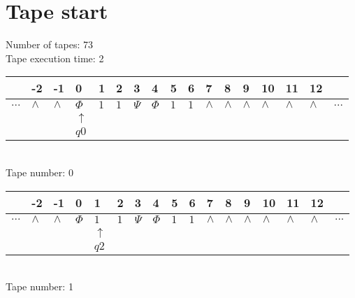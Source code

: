 \documentclass{article}
\begin{document}
\section{Tape start}
Number of tapes: 73\\
Tape execution time: 2\\

\begin{table}[H]
\centering
\begin{tabular}{lllllllllllllllll}
 & -2 & -1 & 0 & 1 & 2 & 3 & 4 & 5 & 6 & 7 & 8 & 9 & 10 & 11 & 12 & \\
\hline
$...$ & \multicolumn{1}{|l|}{$\wedge$} & \multicolumn{1}{|l|}{$\wedge$} & \multicolumn{1}{|l|}{$\Phi$} & \multicolumn{1}{|l|}{$1$} & \multicolumn{1}{|l|}{$1$} & \multicolumn{1}{|l|}{$\Psi$} & \multicolumn{1}{|l|}{$\Phi$} & \multicolumn{1}{|l|}{$1$} & \multicolumn{1}{|l|}{$1$} & \multicolumn{1}{|l|}{$\wedge$} & \multicolumn{1}{|l|}{$\wedge$} & \multicolumn{1}{|l|}{$\wedge$} & \multicolumn{1}{|l|}{$\wedge$} & \multicolumn{1}{|l|}{$\wedge$} & \multicolumn{1}{|l|}{$\wedge$} & $...$\\
\hline
&  &  & $\uparrow$ &  &  &  &  &  &  &  &  &  &  &  &  &  \\
&  &  & $ q0 $ &  &  &  &  &  &  &  &  &  &  &  &  &  \\
\end{tabular}
\\
Tape number: 0
\noindent\makebox[\linewidth]{\hdashrule{\textwidth}{1pt}{1pt}}\end{table}

\begin{table}[H]
\centering
\begin{tabular}{lllllllllllllllll}
 & -2 & -1 & 0 & 1 & 2 & 3 & 4 & 5 & 6 & 7 & 8 & 9 & 10 & 11 & 12 & \\
\hline
$...$ & \multicolumn{1}{|l|}{$\wedge$} & \multicolumn{1}{|l|}{$\wedge$} & \multicolumn{1}{|l|}{$\Phi$} & \multicolumn{1}{|l|}{$1$} & \multicolumn{1}{|l|}{$1$} & \multicolumn{1}{|l|}{$\Psi$} & \multicolumn{1}{|l|}{$\Phi$} & \multicolumn{1}{|l|}{$1$} & \multicolumn{1}{|l|}{$1$} & \multicolumn{1}{|l|}{$\wedge$} & \multicolumn{1}{|l|}{$\wedge$} & \multicolumn{1}{|l|}{$\wedge$} & \multicolumn{1}{|l|}{$\wedge$} & \multicolumn{1}{|l|}{$\wedge$} & \multicolumn{1}{|l|}{$\wedge$} & $...$\\
\hline
&  &  &  & $\uparrow$ &  &  &  &  &  &  &  &  &  &  &  &  \\
&  &  &  & $ q2 $ &  &  &  &  &  &  &  &  &  &  &  &  \\
\end{tabular}
\\
Tape number: 1
\noindent\makebox[\linewidth]{\hdashrule{\textwidth}{1pt}{1pt}}\end{table}
\end{document}
